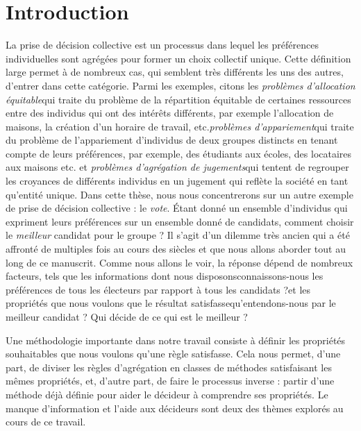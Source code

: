 \setcounter{section}{0}
\section{Introduction}
	La prise de décision collective est un processus dans lequel les préférences individuelles sont agrégées pour former un choix collectif unique. Cette définition large permet à de nombreux cas, qui semblent très différents les uns des autres, d'entrer dans cette catégorie.
	Parmi les exemples, citons les \textit{problèmes d'allocation équitable}\textemdash qui traite du problème de la répartition équitable de certaines ressources entre des individus qui ont des intérêts différents, par exemple l'allocation de maisons, la création d'un horaire de travail, etc.\textemdash \textit{problèmes d'appariement}\textemdash qui traite du problème de l'appariement d'individus de deux groupes distincts en tenant compte de leurs préférences, par exemple, des étudiants aux écoles, des locataires aux maisons etc.\textemdash 
	et \textit{problèmes d'agrégation de jugements}\textemdash qui tentent de regrouper les croyances de différents individus en un jugement qui reflète la société en tant qu'entité unique.
	Dans cette thèse, nous nous concentrerons sur un autre exemple de prise de décision collective : le \textit{vote}. Étant donné un ensemble d'individus qui expriment leurs préférences sur un ensemble donné de candidats, comment choisir le \textit{meilleur} candidat pour le groupe ? Il s'agit d'un dilemme très ancien qui a été affronté de multiples fois au cours des siècles et que nous allons aborder tout au long de ce manuscrit.
	Comme nous allons le voir, la réponse dépend de nombreux facteurs, tels que les informations dont nous disposons\textemdash connaissons-nous les préférences de tous les électeurs par rapport à tous les candidats ?\textemdash et les propriétés que nous voulons que le résultat satisfasse\textemdash qu'entendons-nous par le meilleur candidat ? Qui décide de ce qui est le meilleur ?
	
	Une méthodologie importante dans notre travail consiste à définir les propriétés souhaitables que nous voulons qu'une règle satisfasse. Cela nous permet, d'une part, de diviser les règles d'agrégation en classes de méthodes satisfaisant les mêmes propriétés, et, d'autre part, de faire le processus inverse : partir d'une méthode déjà définie pour aider le décideur à comprendre ses propriétés.
	Le manque d'information et l'aide aux décideurs sont deux des thèmes explorés au cours de ce travail.
	
